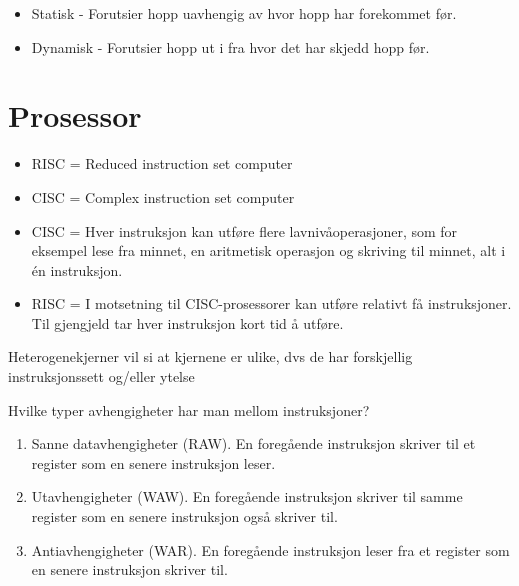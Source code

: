 \documentclass[a4paper, 10pt]{article}
\begin{document}
\begin{itemize}
	\item Statisk - Forutsier hopp uavhengig av hvor hopp har forekommet før.
	\item Dynamisk - Forutsier hopp ut i fra hvor det har skjedd hopp før.
\end{itemize}

\section{Prosessor}

\begin{itemize}
\item RISC = Reduced instruction set computer 
\item CISC = Complex instruction set computer
\item CISC = Hver instruksjon kan utføre flere lavnivåoperasjoner, som for eksempel lese fra minnet, en aritmetisk operasjon og skriving til minnet, alt i én instruksjon.
\item RISC = I motsetning til CISC-prosessorer kan utføre relativt få instruksjoner. Til gjengjeld tar hver instruksjon kort tid å utføre.
\end{itemize}

Heterogenekjerner vil si at kjernene er ulike, dvs de har forskjellig instruksjonssett og/eller ytelse


Hvilke typer avhengigheter har man mellom instruksjoner?

\begin{enumerate}
\item Sanne datavhengigheter (RAW). En foregående instruksjon skriver til et register som en senere instruksjon leser.
\item Utavhengigheter (WAW). En foregående instruksjon skriver til samme register som en senere instruksjon også skriver til.
\item Antiavhengigheter (WAR). En foregående instruksjon leser fra et register som en senere instruksjon skriver til.
\end{enumerate}
\end{document}
